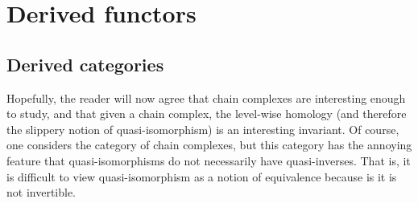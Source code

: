 \documentclass[main.tex]{subfiles}
\begin{document}
\section{Derived functors}
\label{sec:derived_functors}

\subsection{Derived categories}
\label{ssc:derived_categories}

%
%

Hopefully, the reader will now agree that chain complexes are interesting enough to study, and that given a chain complex, the level-wise homology (and therefore the slippery notion of quasi-isomorphism) is an interesting invariant. Of course, one considers the category of chain complexes, but this category has the annoying feature that quasi-isomorphisms do not necessarily have quasi-inverses. That is, it is difficult to view quasi-isomorphism as a notion of equivalence because is it is not invertible.
\end{document}
